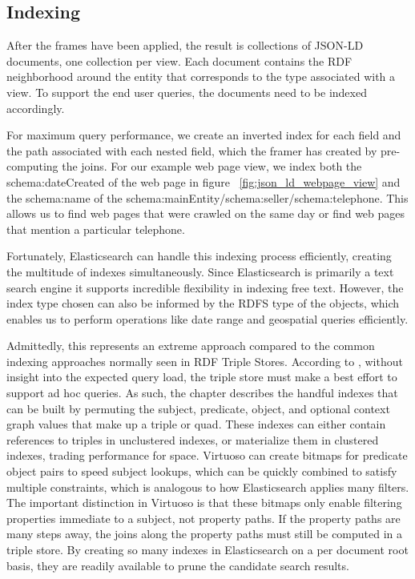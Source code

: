 \subsection{Indexing}
After the frames have been applied, the result is collections of JSON-LD documents, one collection per view.  
Each document contains the RDF neighborhood around the entity that corresponds to the type associated with a view.  
To support the end user queries, the documents need to be indexed accordingly.  

For maximum query performance, we create an inverted index for each field and the path associated with each nested field, which the framer has created by pre-computing the joins.  
For our example web page view,  we index both the schema:dateCreated of the web page in figure ~\ref{fig:json_ld_webpage_view} and the schema:name of the schema:mainEntity/schema:seller/schema:telephone.  
This allows us to find web pages that were crawled on the same day or find web pages that mention a particular telephone.  

Fortunately, Elasticsearch can handle this indexing process efficiently, creating the multitude of indexes simultaneously.  
Since Elasticsearch is primarily a text search engine it supports incredible flexibility in indexing free text.  
However, the index type chosen can also be informed by the RDFS type of the objects, which enables us to perform operations like date range and geospatial queries efficiently.

Admittedly, this represents an extreme approach compared to the common indexing approaches normally seen in RDF Triple Stores.  
According to \cite{Luo_Picalausa_Fletcher_Hidders_Vansummeren_2012}, without insight into the expected query load, the triple store must make a best effort to support ad hoc queries.  
As such, the chapter describes the handful indexes that can be built by permuting the subject, predicate, object, and optional context graph values that make up a triple or quad.
These indexes can either contain references to triples in unclustered indexes, or materialize them in clustered indexes, trading performance for space.
Virtuoso can create bitmaps for predicate object pairs to speed subject lookups, which can be quickly combined to satisfy multiple constraints, which is analogous to how Elasticsearch applies many filters. 
The important distinction in Virtuoso is that these bitmaps only enable filtering properties immediate to a subject, not property paths.
If the property paths are many steps away, the joins along the property paths must still be computed in a triple store.
By creating so many indexes in Elasticsearch on a per document root basis, they are readily available to prune the candidate search results.



 